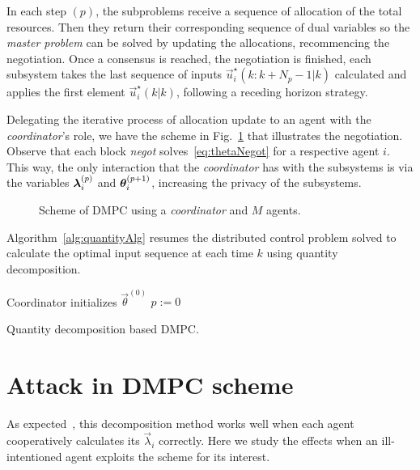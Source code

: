 \documentclass[a4paper, 10 pt, conference]{ieeeconf}  %
\begin{document}
In each step $(p)$, the subproblems receive a sequence of  allocation of the total resources.
Then they return their corresponding sequence of dual variables so the \emph{master problem} can be solved by updating the allocations, recommencing the negotiation.
Once a consensus is reached, the negotiation is finished, each subsystem takes the last sequence of inputs $\vec{u}_{i}^{\star}(k:k+N_{p}-1|k)$ calculated and applies the first element $\vec{u}_{i}^{\star}(k|k)$, following a receding horizon strategy.

Delegating the iterative process of allocation update to an agent with the \emph{coordinator}'s role, we have the scheme in Fig.~\ref{fig:schemeQuantity} that illustrates the negotiation.
Observe that each block \emph{negot} solves~\eqref{eq:thetaNegot} for a respective agent $i$.
This way, the only interaction that the \emph{coordinator} has with the subsystems is via the variables $\bm{\lambda}_{i}^{(p)}$ and $\bm{\theta}_{i}^{(p+1)}$, increasing the privacy of the subsystems.
\begin{figure}[!t]
  \centering
 \footnotesize {} 
 \caption{Scheme of DMPC using a \emph{coordinator} and $M$ agents.}\label{fig:schemeQuantity}
\end{figure}

Algorithm~\ref{alg:quantityAlg} resumes the distributed control problem solved to calculate the optimal input sequence at each time $k$ using quantity decomposition.
\begin{algorithm}[!t]
  \DontPrintSemicolon
  Coordinator initializes $\vec{\theta}^{(0)}$ \;
  $p:=0$\;
 \caption{Quantity decomposition based DMPC.}\label{alg:quantityAlg}
\end{algorithm}


\section{Attack in DMPC scheme}\label{sec:attack}


As expected~\cite{BoydEtAl2015,Cohen1978}, this decomposition method works well when each agent cooperatively calculates its $\vec{\lambda}_{i}$ correctly.
Here we study the effects when an ill-intentioned agent exploits the scheme for its interest.
\end{document}

